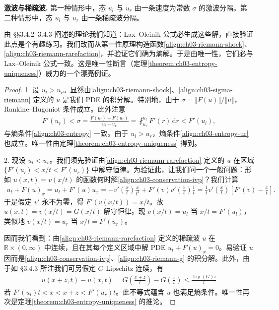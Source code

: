 \documentclass[../../main.tex]{subfiles}
\begin{document}
\textbf{激波与稀疏波.} 第一种情形中，态 $u_l$ 与 $u_r$ 由一条速度为常数 $\sigma$ 的激波分隔。第二种情形中，态 $u_l$ 与 $u_r$ 由一条稀疏波分隔。

由 \S\S3.4.2--3.4.3 阐述的理论我们知道：Lax--Oleinik 公式必生成这些解，直接验证此点是个有趣练习。我们改而从第一性原理构造函数\eqref{align:ch03-riemann-shock}、\eqref{align:ch03-riemann-rarefaction}，并验证它们确为熵解。于是由唯一性，它们必与 Lax--Oleinik 公式一致。这是唯一性断言（定理\cref{theorem:ch03-entropy-uniqueness}）威力的一个漂亮例证。

\begin{proof}
1. 设 $u_l>u_r$。显然由\eqref{align:ch03-riemann-shock}、\eqref{align:ch03-sigma-riemann} 定义的 $u$ 是我们 PDE 的积分解。特别地，由于 $\sigma=\llbracket F(u)\rrbracket/\llbracket u\rrbracket$，Rankine--Hugoniot 条件成立。此外注意
\begin{align*}
F'(u_r)<\sigma=\frac{F(u_l)-F(u_r)}{u_l-u_r}=\fint_{u_r}^{u_l}F'(r)\,\mathrm{d}r<F'(u_l),
\end{align*}
与熵条件\eqref{align:ch03-entropy} 一致。由于 $u_l>u_r$，熵条件\eqref{align:ch03-entropy-ur} 也成立。唯一性由定理\cref{theorem:ch03-entropy-uniqueness} 得到。

2. 现设 $u_l<u_r$。我们须先验证由\eqref{align:ch03-riemann-rarefaction} 定义的 $u$ 在区域 $\{F'(u_l)<x/t<F'(u_r)\}$ 中解守恒律。为验证此，让我们问一个一般问题：形如 $u(x,t)=v(x/t)$ 的函数何时解\eqref{align:ch03-conservation-ivp}？我们计算
\begin{align*}
u_t+F(u)_x=u_t+F'(u)u_x=-v'\!\left(\frac{x}{t}\right)\frac{x}{t^2}+F'(v)v'\!\left(\frac{x}{t}\right)\frac{1}{t}=\frac{1}{t}v'\!\left(\frac{x}{t}\right)\left[F'(v)-\frac{x}{t}\right].
\end{align*}
于是假定 $v'$ 永不为零，得 $F'(v(x/t))=x/t$。故 $u(x,t)=v(x/t)=G(x/t)$ 解守恒律。现 $v(x/t)=u_l$ 当 $x/t=F'(u_l)$，类似地 $v(x/t)=u_r$ 当 $x/t=F'(u_r)$。

因而我们看到：由\eqref{align:ch03-riemann-rarefaction} 定义的稀疏波 $u$ 在 $\mathbb{R}\times(0,\infty)$ 中连续，且在其每个定义区域中解 PDE $u_t+F(u)_x=0$。易验证 $u$ 因而是\eqref{align:ch03-conservation-ivp}、\eqref{align:ch03-riemann-g} 的积分解。此外，由于如 \S3.4.3 所注我们可另假定 $G$ Lipschitz 连续，有
\begin{align*}
u(x+z,t)-u(x,t)=G\!\left(\frac{x+z}{t}\right)-G\!\left(\frac{x}{t}\right)\leqslant\frac{\operatorname{Lip}(G)z}{t}
\end{align*}
若 $F'(u_l)t<x<x+z<F'(u_r)t$。此不等式蕴含 $u$ 也满足熵条件。唯一性再次是定理\cref{theorem:ch03-entropy-uniqueness} 的推论。
\end{proof}
\end{document}
